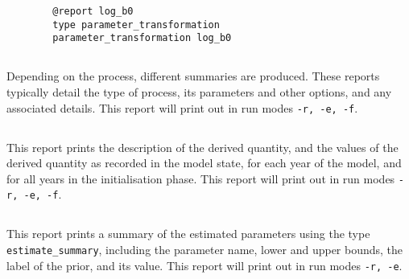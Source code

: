 {\small{\begin{verbatim}
		@report log_b0
		type parameter_transformation
		parameter_transformation log_b0
		\end{verbatim}}}

\subsection{}\label{sec:Report-Process}

Depending on the process, different summaries are produced. These reports typically detail the type of process, its parameters and other options, and any associated details. This report will print out in run modes \texttt{-r, -e, -f}.

\subsection{}\label{sec:Report-DerivedQuantity}

This report prints the description of the derived quantity, and the values of the derived quantity as recorded in the model state, for each year of the model, and for all years in the initialisation phase. This report will print out in run modes \texttt{-r, -e, -f}.

\subsection{}\label{sec:Report-EstimateSummary}

This report prints a summary of the estimated parameters using the type \texttt{estimate\_summary}, including the parameter name, lower and upper bounds, the label of the prior, and its value. This report will print out in run modes \texttt{-r, -e}.



